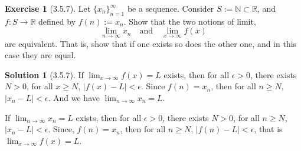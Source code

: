\documentclass{article}
\theoremstyle{definition}
\newtheorem{exe}{Exercise}[section]
\newtheorem{sol}{Solution}[exe]
\begin{document}
\begin{exe}[3.5.7]
    Let \(\{x_n\}_{n=1}^{\infty}\) be a sequence. Consider \( S := \mathbb{N} \subset \mathbb{R} \), and \( f: S \rightarrow \mathbb{R} \) defined by \( f(n) := x_n \). Show that the two notions of limit,
    \[
    \lim_{n \rightarrow \infty} x_n \quad \text{and} \quad \lim_{x \rightarrow \infty} f(x)
    \]
    are equivalent. That is, show that if one exists so does the other one, and in this case they are equal.
\end{exe}

\begin{sol}[3.5.7]

If $\lim_{x\to\infty}f(x)=L$ exists, then for all $\epsilon>0$, there exists $N>0$, for all $x\geq N$, $|f(x)-L|<\epsilon$. Since $f(n)=x_n$, then for all $n\geq N$, $|x_n-L|<\epsilon$. And we have $\lim_{n\to\infty} x_n =L$. 

If $\lim_{n\to\infty}x_n=L$ exists, then for all $\epsilon>0$, there exists $N>0$, for all $n\geq N$, $|x_n-L|<\epsilon$. Since, $f(n)=x_n$, then for all $n\geq N$, $|f(n)-L|<\epsilon$, that is $\lim_{x\to\infty}f(x)=L$.
\end{sol}
\end{document}
